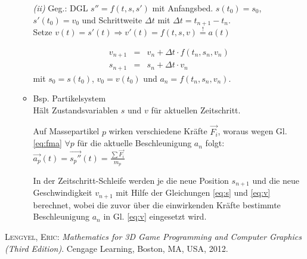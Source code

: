 \documentclass[a4paper, 12pt, onecolumn]{scrartcl}
\begin{document}
\begin{itemize}
\begin{itemize}
        \emph{(ii)} Geg.: DGL $s'' = f (t, s, s')$ mit Anfangsbed. $s (t_0) = s_0$, 
        $s' (t_0) = v_0$ und Schrittweite $\Delta t$ mit $\Delta t = t_{n+1} - t_n$.\\
        Setze $v (t) = s' (t) \Rightarrow v' (t) = f (t, s, v) \stackrel{!}= a (t)$
        
        \begin{eqnarray}
        v_{n+1} &=& v_n + \Delta t \cdot f (t_n, s_n, v_n) \label{eq:v}\\   %
        s_{n+1} &=& s_n + \Delta t \cdot v_n \label{eq:s}
        \end{eqnarray}
        mit $s_0 = s (t_0)$, $v_0 = v (t_0)$ und $a_n = f (t_n, s_n, v_n)$.
        
        \item Bsp. Partikelsystem\\
        Hält Zustandsvariablen $s$ und $v$ für aktuellen Zeitschritt.
        
        Auf Massepartikel $p$ wirken verschiedene Kräfte $\vec{F_i}$, woraus wegen 
        Gl. \ref{eq:fma} $\forall p$ für die aktuelle Beschleunigung $a_n$ folgt: 
        $\vec{a_p} (t) = \vec{s_p''} (t) = \frac{\sum{\vec{F_i}}}{m_p}$
        
        In der Zeitschritt-Schleife werden je die neue Position $s_{n+1}$ und die neue Geschwindigkeit $v_{n+1}$
        mit Hilfe der Gleichungen \ref{eq:s} und \ref{eq:v} berechnet, wobei die zuvor über die
        einwirkenden Kräfte bestimmte Beschleunigung $a_n$ in Gl. \ref{eq:v} eingesetzt wird.
        
    \end{itemize}
    
  \end{itemize}

\vfill

\begin{thebibliography}{Len12}
{\normalfont\scshape Lengyel, Eric}: {\em Mathematics for 3D Game Programming and Computer Graphics (Third Edition)}.
\newblock Cengage Learning, Boston, MA, USA, 2012.
\end{thebibliography}
\end{document}
